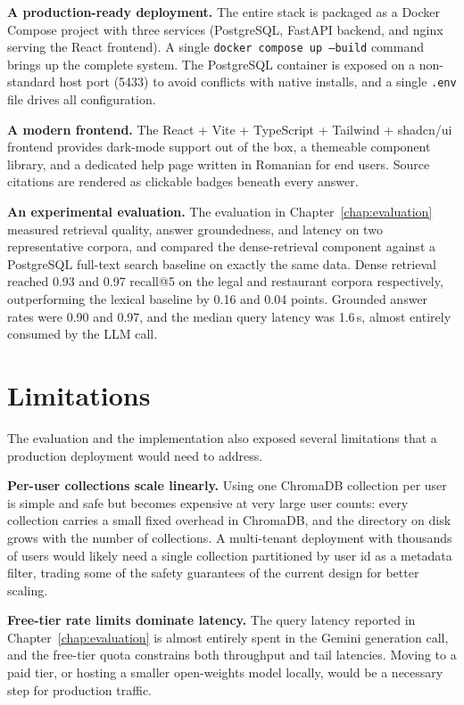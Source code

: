 \textbf{A production-ready deployment.} The entire stack is packaged as
a Docker Compose project with three services (PostgreSQL, FastAPI
backend, and nginx serving the React frontend). A single \texttt{docker
compose up --build} command brings up the complete system. The
PostgreSQL container is exposed on a non-standard host port (5433) to
avoid conflicts with native installs, and a single \texttt{.env} file
drives all configuration.

\textbf{A modern frontend.} The React + Vite + TypeScript + Tailwind +
shadcn/ui frontend provides dark-mode support out of the box, a
themeable component library, and a dedicated help page written in
Romanian for end users. Source citations are rendered as clickable
badges beneath every answer.

\textbf{An experimental evaluation.} The evaluation in
Chapter~\ref{chap:evaluation} measured retrieval quality, answer
groundedness, and latency on two representative corpora, and compared
the dense-retrieval component against a PostgreSQL full-text search
baseline on exactly the same data. Dense retrieval reached 0.93 and
0.97 recall@5 on the legal and restaurant corpora respectively,
outperforming the lexical baseline by 0.16 and 0.04 points. Grounded
answer rates were 0.90 and 0.97, and the median query latency was
1.6\,s, almost entirely consumed by the LLM call.

\section{Limitations}
\label{sec:limitations}

The evaluation and the implementation also exposed several limitations
that a production deployment would need to address.

\textbf{Per-user collections scale linearly.} Using one ChromaDB
collection per user is simple and safe but becomes expensive at very
large user counts: every collection carries a small fixed overhead in
ChromaDB, and the directory on disk grows with the number of
collections. A multi-tenant deployment with thousands of users would
likely need a single collection partitioned by user id as a metadata
filter, trading some of the safety guarantees of the current design
for better scaling.

\textbf{Free-tier rate limits dominate latency.} The query latency
reported in Chapter~\ref{chap:evaluation} is almost entirely spent in
the Gemini generation call, and the free-tier quota constrains both
throughput and tail latencies. Moving to a paid tier, or hosting a
smaller open-weights model locally, would be a necessary step for
production traffic.

